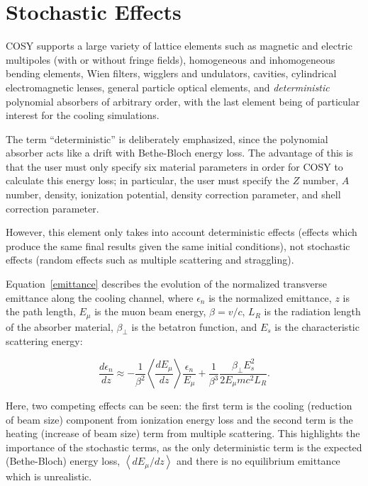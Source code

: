 \documentclass{jacow}
\begin{document}
\section{Stochastic Effects}

COSY supports a large variety of lattice elements such as magnetic and electric multipoles (with or without fringe fields), homogeneous and inhomogeneous bending elements, Wien filters, wigglers and undulators, cavities, cylindrical electromagnetic lenses, general particle optical elements, and \emph{deterministic} polynomial absorbers of arbitrary order, with the last element being of particular interest for the cooling simulations.


The term ``deterministic'' is deliberately emphasized, since the polynomial absorber acts like a drift with Bethe-Bloch energy loss. The advantage of this is that the user must only specify six material parameters in order for COSY to calculate this energy loss; in particular, the user must specify the $Z$ number, $A$ number, density, ionization potential, density correction parameter, and shell correction parameter.

However, this element only takes into account deterministic effects (effects which produce the same final results given the same initial conditions), not stochastic effects (random effects such as multiple scattering and straggling).

Equation~\eqref{emittance} describes the evolution of the normalized transverse emittance along the cooling channel, where $\epsilon_n$ is the normalized emittance, $z$ is the path length, $E_\mu$ is the muon beam energy, $\beta = v/c$, $L_R$ is the radiation length of the absorber material, $\beta_\perp$ is the betatron function, and $E_s$ is the characteristic scattering energy:

\begin{equation}
\frac{d\epsilon_n }{dz} \approx -\frac{1}{\beta^2} \left< \frac{dE_\mu}{dz} \right> \frac{\epsilon_n}{E_\mu} + \frac{1}{\beta^3} \frac{\beta_\perp E_s ^2}{2E_\mu mc^2 L_R}.
\label{emittance}
\end{equation}

Here, two competing effects can be seen: the first term is the cooling (reduction of beam size) component from ionization energy loss and the second term is the heating (increase of beam size) term from multiple scattering. This highlights the importance of the stochastic terms, as the only deterministic term is the expected (Bethe-Bloch) energy loss, $\left< dE_\mu/dz \right>$ and there is no equilibrium emittance which is unrealistic.
\end{document}
